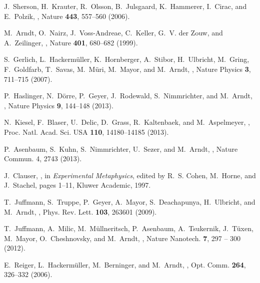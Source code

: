 \documentclass[11pt]{article}
\begin{document}
\begin{thebibliography}{100}
J.~Sherson, H.~Krauter, R.~Olsson, B.~Julsgaard, K.~Hammerer, I.~Cirac, and
  E.~Polzik,
,
\newblock Nature {\bf 443}, 557--560 (2006).

M.~Arndt, O.~Nairz, J.~Voss-Andreae, C.~Keller, G.~V. der Zouw, and
  A.~Zeilinger,
,
\newblock Nature {\bf 401}, 680--682 (1999).

S.~Gerlich, L.~Hackermüller, K.~Hornberger, A.~Stibor, H.~Ulbricht, M.~Gring,
  F.~Goldfarb, T.~Savas, M.~Müri, M.~Mayor, and M.~Arndt,
,
\newblock Nature Physics {\bf 3}, 711--715 (2007).

P.~Haslinger, N.~Dörre, P.~Geyer, J.~Rodewald, S.~Nimmrichter, and M.~Arndt,
,
\newblock Nature Physics {\bf 9}, 144–148 (2013).

N.~Kiesel, F.~Blaser, U.~Delic, D.~Grass, R.~Kaltenbaek, and M.~Aspelmeyer,
,
\newblock Proc. Natl. Acad. Sci. USA {\bf 110}, 14180–14185 (2013).

P.~Asenbaum, S.~Kuhn, S.~Nimmrichter, U.~Sezer, and M.~Arndt,
,
\newblock Nature Commun. 4, 2743 (2013).

J.~Clauser,
,
\newblock in {\em Experimental Metaphysics}, edited by R.~S. Cohen, M.~Horne,
  and J.~Stachel, pages 1--11, Kluwer Academic, 1997.

T.~Juffmann, S.~Truppe, P.~Geyer, A.~Mayor, S.~Deachapunya, H.~Ulbricht, and
  M.~Arndt,
,
\newblock Phys. Rev. Lett. {\bf 103}, 263601 (2009).

T.~Juffmann, A.~Milic, M.~Müllneritsch, P.~Asenbaum, A.~Tsukernik, J.~Tüxen,
  M.~Mayor, O.~Cheshnovsky, and M.~Arndt,
,
\newblock Nature Nanotech. {\bf 7}, 297 -- 300 (2012).

E.~Reiger, L.~Hackerm{\"u}ller, M.~Berninger, and M.~Arndt,
,
\newblock Opt. Comm. {\bf 264}, 326--332 (2006).


\end{thebibliography}
\end{document}
